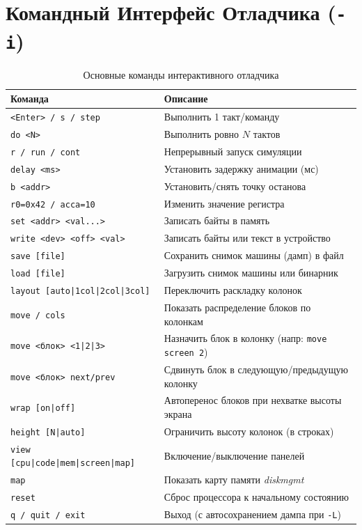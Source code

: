 \documentclass[11pt,a4paper]{article}
\begin{document}
\section{Командный Интерфейс Отладчика (\texttt{-i})}

\begin{table}[h!]
\centering
\begin{tabular}{@{}ll@{}}
\toprule
\textbf{Команда} & \textbf{Описание} \\ \midrule
\texttt{<Enter> / s / step} & Выполнить 1 такт/команду \\
\texttt{do <N>} & Выполнить ровно $N$ тактов \\
\texttt{r / run / cont} & Непрерывный запуск симуляции \\
\texttt{delay <ms>} & Установить задержку анимации (мс) \\
\texttt{b <addr>} & Установить/снять точку останова \\
\texttt{r0=0x42 / acca=10} & Изменить значение регистра \\
\texttt{set <addr> <val...>} & Записать байты в память \\
\texttt{write <dev> <off> <val>} & Записать байты или текст в устройство \\
\texttt{save [file]} & Сохранить снимок машины (дамп) в файл \\
\texttt{load [file]} & Загрузить снимок машины или бинарник \\
\texttt{layout [auto|1col|2col|3col]} & Переключить раскладку колонок \\
\texttt{move / cols} & Показать распределение блоков по колонкам \\
\texttt{move <блок> <1|2|3>} & Назначить блок в колонку (напр: \texttt{move screen 2}) \\
\texttt{move <блок> next/prev} & Сдвинуть блок в следующую/предыдущую колонку \\
\texttt{wrap [on|off]} & Автоперенос блоков при нехватке высоты экрана \\
\texttt{height [N|auto]} & Ограничить высоту колонок (в строках) \\
\texttt{view [cpu|code|mem|screen|map]} & Включение/выключение панелей \\
\texttt{map} & Показать карту памяти \textit{diskmgmt} \\
\texttt{reset} & Сброс процессора к начальному состоянию \\
\texttt{q / quit / exit} & Выход (с автосохранением дампа при \texttt{-L}) \\ \bottomrule
\end{tabular}
\caption{Основные команды интерактивного отладчика}
\end{table}
\end{document}
